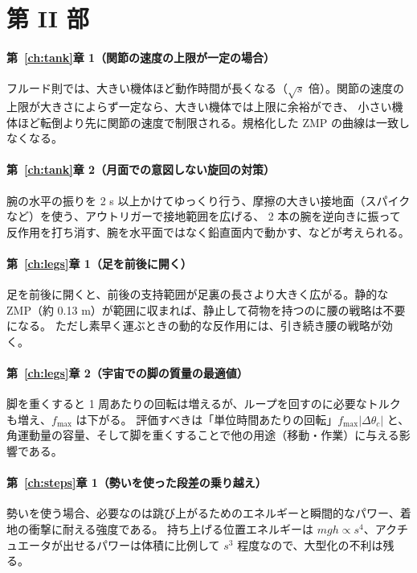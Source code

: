 \section{第 II 部}

\paragraph{第~\ref{ch:tank}章 1（関節の速度の上限が一定の場合）}
フルード則では、大きい機体ほど動作時間が長くなる（$\sqrt{s}$ 倍）。関節の速度の上限が大きさによらず一定なら、大きい機体では上限に余裕ができ、
小さい機体ほど転倒より先に関節の速度で制限される。規格化した ZMP の曲線は一致しなくなる。

\paragraph{第~\ref{ch:tank}章 2（月面での意図しない旋回の対策）}
腕の水平の振りを 2 s 以上かけてゆっくり行う、摩擦の大きい接地面（スパイクなど）を使う、アウトリガーで接地範囲を広げる、
2 本の腕を逆向きに振って反作用を打ち消す、腕を水平面ではなく鉛直面内で動かす、などが考えられる。

\paragraph{第~\ref{ch:legs}章 1（足を前後に開く）}
足を前後に開くと、前後の支持範囲が足裏の長さより大きく広がる。静的な ZMP（約 0.13 m）が範囲に収まれば、静止して荷物を持つのに腰の戦略は不要になる。
ただし素早く運ぶときの動的な反作用には、引き続き腰の戦略が効く。

\paragraph{第~\ref{ch:legs}章 2（宇宙での脚の質量の最適値）}
脚を重くすると 1 周あたりの回転は増えるが、ループを回すのに必要なトルクも増え、$f_{\max}$ は下がる。
評価すべきは「単位時間あたりの回転」$f_{\max}|\Delta\theta_c|$ と、角運動量の容量、そして脚を重くすることで他の用途（移動・作業）に与える影響である。

\paragraph{第~\ref{ch:steps}章 1（勢いを使った段差の乗り越え）}
勢いを使う場合、必要なのは跳び上がるためのエネルギーと瞬間的なパワー、着地の衝撃に耐える強度である。
持ち上げる位置エネルギーは $mgh\propto s^4$、アクチュエータが出せるパワーは体積に比例して $s^3$ 程度なので、大型化の不利は残る。


